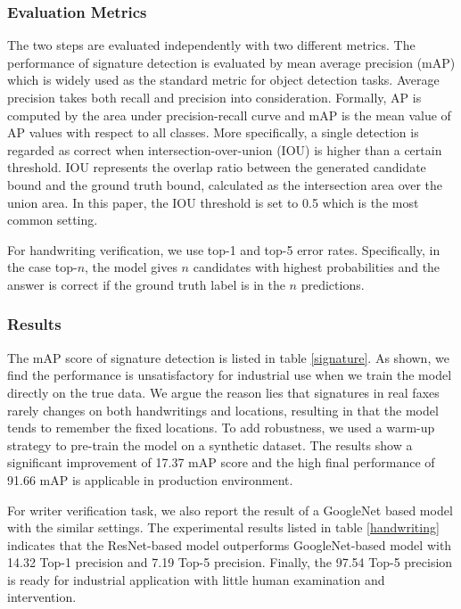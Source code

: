 \documentclass[sigconf]{acmart}
\begin{document}
\subsubsection*{\rm \textbf{Evaluation Metrics}}
The two steps are evaluated independently with two different metrics. The performance of signature detection is evaluated by mean average precision (mAP) which is widely used as the standard metric for object detection tasks. Average precision takes both recall and precision into consideration. Formally, AP is computed by the area under precision-recall curve and mAP is the mean value of AP values with respect to all classes. More specifically, a single detection is regarded as correct when intersection-over-union (IOU) is higher than a certain threshold. IOU represents the overlap ratio between the generated candidate bound and the ground truth bound, calculated as the intersection area over the union area. In this paper, the IOU threshold is set to 0.5 which is the most common setting. 

For handwriting verification, we use top-1 and top-5 error rates. Specifically, in the case top-$n$, the model gives $n$ candidates with highest probabilities and the answer is correct if the ground truth label is in the $n$ predictions. 
\subsubsection*{\rm \textbf{Results}}
The mAP score of signature detection is listed in table \ref{signature}. As shown, we find the performance is unsatisfactory for industrial use when we train the model directly on the true data. We argue the reason lies that signatures in real faxes rarely changes on both handwritings and locations, resulting in that the model tends to remember the fixed locations. To add robustness, we used a warm-up strategy to pre-train the model on a synthetic dataset. The results show a significant improvement of 17.37 mAP score and the high final performance of 91.66 mAP is applicable in production environment.

For writer verification task, we also report the result of a GoogleNet based model \cite{szegedy2015going} with the similar settings. The experimental results listed in table \ref{handwriting} indicates that the ResNet-based model outperforms GoogleNet-based model with 14.32 Top-1 precision and 7.19 Top-5 precision. Finally, the 97.54 Top-5 precision is ready for industrial application with little human examination and intervention.
\end{document}
